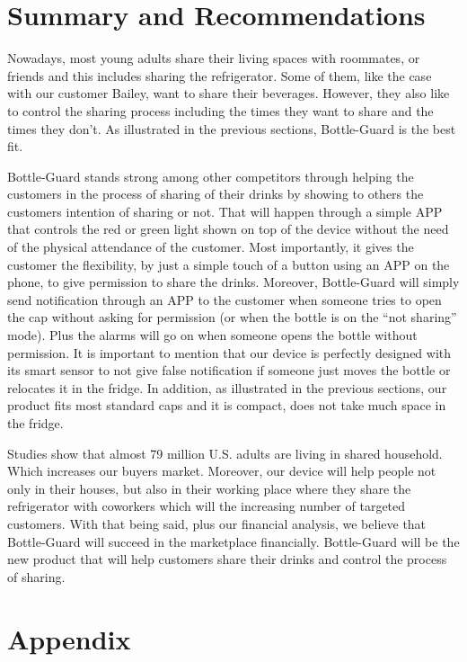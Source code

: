 \documentclass[12pt]{article}
\begin{document}
	\section*{Summary and Recommendations}
		
		Nowadays, most young adults share their living spaces with roommates, or friends and this includes sharing the refrigerator. Some of them, like the case with our customer Bailey, want to share their beverages. However, they also like to control the sharing process including the times they want to share and the times they don’t. As illustrated in the previous sections, Bottle-Guard is the best fit. 
		
		Bottle-Guard stands strong among other competitors through helping the customers in the process of sharing of their drinks by showing to others the customers intention of sharing or not. That will happen through a simple APP that controls the red or green light shown on top of the device without the need of the physical attendance of the customer. Most importantly, it gives the customer the flexibility, by just a simple touch of a button using an APP on the phone, to give permission to share the drinks. Moreover, Bottle-Guard will simply send notification through an APP to the customer when someone tries to open the cap without asking for permission (or when the bottle is on the “not sharing” mode). Plus the alarms will go on when someone opens the bottle without permission. It is important to mention that our device is perfectly designed with its smart sensor to not give false notification if someone just moves the bottle or relocates it in the fridge. In addition, as illustrated in the previous sections, our product fits most standard caps and it is compact, does not take much space in the fridge. 
		
		Studies show that almost 79 million U.S. adults are living in shared household. Which increases our buyers market. Moreover, our device will help people not only in their houses, but also in their working place where they share the refrigerator with coworkers which will the increasing number of targeted customers. With that being said, plus our financial analysis, we believe that Bottle-Guard will succeed in the marketplace financially. Bottle-Guard will be the new product that will help customers share their drinks and control the process of sharing.
		
		\newpage
		\section*{Appendix}
\end{document}
